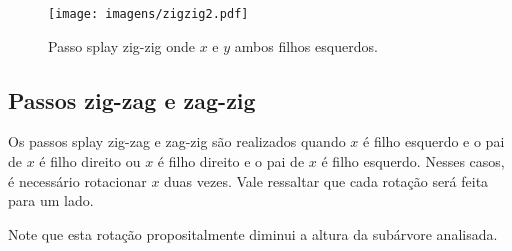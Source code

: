 {\begin{figure}[H]
\begin{comment}
        \begin{scope}[local bounding box=scope1]
        \Tree [.$z$  [.$y$ [.$x$ \node[alpha]{a}; \node[alpha]{b}; ] \node[alpha]{c};] \node[alpha]{d};]
        \end{scope}
        
        \begin{scope}[xshift=6cm, local bounding box=scope2]
        \Tree [.$x$ \node[alpha]{a}; [.$y$ \node[alpha]{b}; [.$z$ \node[alpha]{c}; \node[alpha]{d}; ]]]
        \end{scope}
        
        \draw[->] ([yshift=-0.5*\ht\strutbox,xshift=0.5cm]scope1.east) -- node [n] {} ([yshift=-0.5*\ht\strutbox,xshift=-0.5cm]scope2.west); %
        
        \draw[->] ([yshift=-2.20cm, xshift=-0.98cm]scope1.north) arc (198:-18:0.7cm);
        \draw[->,red] ([yshift=-3.67cm, xshift=-1.89cm]scope1.north) arc (198:-18:0.7cm);
    
    \end{tikzpicture}
    \end{comment}
    \texttt{[image: imagens/zigzig2.pdf]}
    \label{fig:zigzig}
\caption{Passo splay zig-zig onde $x$ e $y$ ambos filhos esquerdos.}
\end{figure}


\subsection{Passos zig-zag e zag-zig}

Os passos splay zig-zag e zag-zig são realizados quando $x$ é filho esquerdo e o pai de $x$ é filho direito ou $x$ é filho direito e o pai de $x$ é filho esquerdo. Nesses casos, é necessário rotacionar $x$ duas vezes. Vale ressaltar que cada rotação será feita para um lado.

Note que esta rotação propositalmente diminui a altura da subárvore analisada.
    
\begin{figure}[H]
    \centering
    \begin{comment}
    \begin{tikzpicture}[
        ed/.style = {densely dashed, shorten >= 5pt},
        alpha/.style = {regular polygon, regular polygon sides=3, draw, minimum size=1.1cm, inner sep=2pt, anchor=south},
        level distance=1.5cm,
        sibling distance=0.25cm
        ]

        \begin{scope}[local bounding box=scope1]
            \Tree [.$z$  [.$y$ \node[alpha]{a}; [.$x$ \node[alpha]{b}; \node[alpha]{c}; ]] \node[alpha]{d};]
        \end{scope}
        

\end{comment}
\end{figure}}
